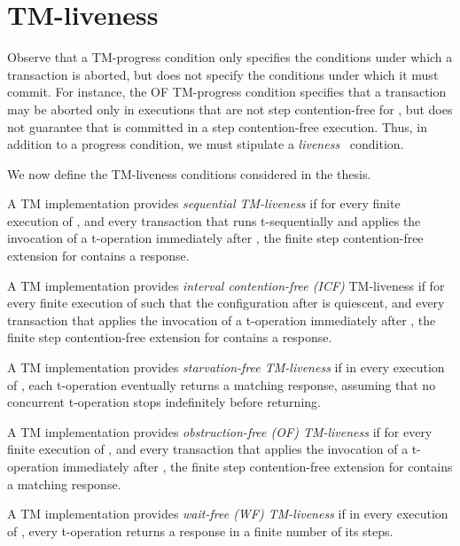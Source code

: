 \section{TM-liveness}
\label{sec:tm-liveness}
Observe that a TM-progress condition only specifies the conditions under which a transaction is aborted, but does not
specify the conditions under which it must commit.
For instance, the OF TM-progress condition specifies that a transaction  may be aborted only in executions
that are not step contention-free for , but does not guarantee that  is committed in a step contention-free execution.
Thus, in addition to a progress condition, we must stipulate a \emph{liveness}~\cite{AS85,Lyn96} condition.

We now define the TM-liveness conditions considered in the thesis.
\begin{definition}
A TM implementation  provides \emph{sequential TM-liveness} if for every finite execution  of , 
and every transaction  that runs t-sequentially and applies the invocation of a t-operation  immediately after , 
the finite step contention-free extension for  contains a response.
\end{definition}
\begin{definition}
A TM implementation  provides \emph{interval contention-free (ICF)} TM-liveness
if for every finite execution  of  such that the configuration after  is quiescent, 
and every transaction  that applies the invocation of a t-operation  immediately after , 
the finite step contention-free extension for  contains a response.
\end{definition}
\begin{definition}
A TM implementation  provides \emph{starvation-free TM-liveness} if in every execution of , each t-operation 
eventually returns a matching response, assuming that no concurrent t-operation stops indefinitely before returning.  
\end{definition}
\begin{definition}
A TM implementation  provides \emph{obstruction-free (OF) TM-liveness} if for every finite execution  of , 
and every transaction  that applies the invocation of a t-operation  immediately after , 
the finite step contention-free extension for  contains a matching response.
\end{definition}
\begin{definition}
A TM implementation  provides \emph{wait-free (WF) TM-liveness} if
in every execution of , every t-operation returns a response in a finite number of its steps.
\end{definition}
